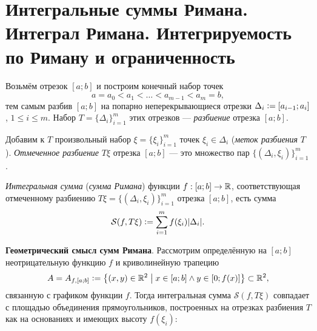 \section{Интегральные суммы Римана. Интеграл Римана. Интегрируемость по Риману и ограниченность}

\begin{definition}
    Возьмём отрезок $[a; b]$ и построим конечный набор точек
    \[
        a = a_0 < a_1 < \ldots < a_{m - 1} < a_m = b,
    \]
    тем самым разбив $[a; b]$ на попарно неперекрывающиеся отрезки $\Delta_i \vcentcolon = [a_{i - 1}; a_i]$, $1 \leqslant i \leqslant m$. Набор $T = \{\Delta_i\}_{i = 1}^m$ этих отрезков --- \textit{разбиение} отрезка $[a; b]$.
\end{definition}

\begin{definition}
    Добавим к $T$ произвольный набор $\xi = \{\xi_i\}_{i = 1}^m$ точек $\xi_i \in \Delta_i$ (\textit{меток разбиения} $T$). \textit{Отмеченное разбиение} $T\xi$ отрезка $[a; b]$ --- это множество пар $\{(\Delta_i, \xi_i)\}_{i = 1}^m$.
\end{definition}

\begin{definition}
    \textit{Интегральная сумма} (\textit{сумма Римана}) функции $f: [a; b] \to \mathbb{R}$, соответствующая отмеченному разбиению $T\xi = \{(\Delta_i, \xi_i)\}_{i = 1}^m$ отрезка $[a; b]$, есть сумма
    \[
        \mathcal{S}(f, T\xi) \vcentcolon = \sum_{i = 1}^mf(\xi_i)|\Delta_i|.
    \]
\end{definition}

\textbf{Геометрический смысл сумм Римана}. Рассмотрим определённую на $[a; b]$ неотрицательную функцию $f$ и криволинейную трапецию
\[
    A = A_{f, [a; b]} \vcentcolon = \left\{(x, y) \in \mathbb{R}^2\;\middle\vert\; x \in [a; b] \wedge y \in [0; f(x)]\right\} \subset \mathbb{R}^2,
\]
связанную с графиком функции $f$. Тогда интегральная сумма $\mathcal{S}(f, T\xi)$ совпадает с площадью объединения прямоугольников, построенных на отрезках разбиения $T$ как на основаниях и имеющих высоту $f(\xi_i)$:

